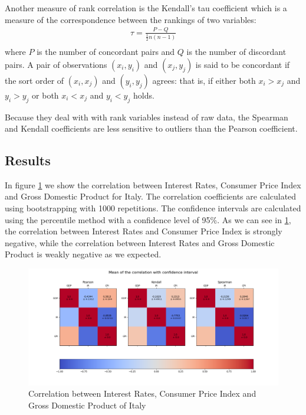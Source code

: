 Another measure of rank correlation is the Kendall's tau coefficient which is a measure of the correspondence between the rankings of two variables:
\begin{align*}
    \tau = \frac{P-Q}{\frac{1}{2}n(n-1)} \\
\end{align*}
where $P$ is the number of concordant pairs and $Q$ is the number of discordant pairs. A pair of observations $(x_{i},y_{i})$ and $( x_j , y_j) $ is said to be concordant if the sort order of $( x_i , x_j )$ and $( y_i , y_j )$ agrees: that is, if either both  $x_{i}>x_{j}$ and  $y_{i}>y_{j}$ or both $\displaystyle x_{i}<x_{j}$ and $y_{i}<y_{j}$ holds.

Because they deal with with rank variables instead of raw data, the Spearman and Kendall coefficients are less sensitive to outliers than the Pearson coefficient.

\subsection*{Results}
In figure \ref{fig:correlation_italy} we show the correlation between Interest Rates, Consumer Price Index and Gross Domestic Product for Italy. The correlation coefficients are calculated using bootstrapping with 1000 repetitions. The confidence intervals are calculated using the percentile method with a confidence level of 95\%.
As we can see in \ref{fig:correlation_italy}, the correlation between Interest Rates and Consumer Price Index is strongly negative, while the correlation between Interest Rates and Gross Domestic Product is weakly negative as we expected.

\begin{figure}[H]
    \centering
    \includegraphics[width=\linewidth]{imgs/italy_correlation.png}
    \caption{Correlation between Interest Rates, Consumer Price Index and Gross Domestic Product of Italy}
    \label{fig:correlation_italy}
\end{figure}

